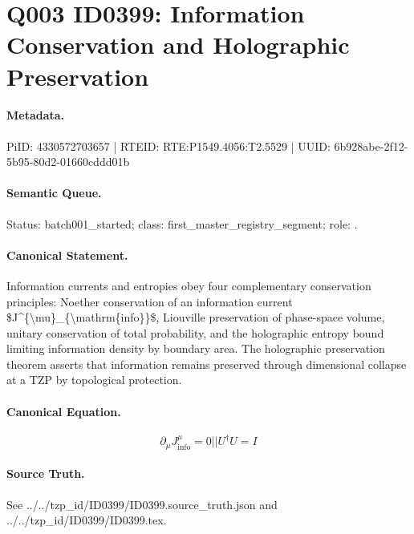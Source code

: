 \section*{Q003 ID0399: Information Conservation and Holographic Preservation}
\paragraph{Metadata.}
PiID: 4330572703657 | RTEID: RTE:P1549.4056:T2.5529 | UUID: 6b928abe-2f12-5b95-80d2-01660cddd01b

\paragraph{Semantic Queue.}
Status: batch001\_started; class: first\_master\_registry\_segment; role: .

\paragraph{Canonical Statement.}
Information currents and entropies obey four complementary conservation principles: Noether conservation of an information current \$J\textasciicircum{}\{\textbackslash{}mu\}\_\{\textbackslash{}mathrm\{info\}\}\$, Liouville preservation of phase-space volume, unitary conservation of total probability, and the holographic entropy bound limiting information density by boundary area. The holographic preservation theorem asserts that information remains preserved through dimensional collapse at a TZP by topological protection.

\paragraph{Canonical Equation.}
\[
\partial_{\mu}J^{\mu}_{\mathrm{info}}=0 || U^{\dagger}U=I
\]

\paragraph{Source Truth.}
See ../../tzp\_id/ID0399/ID0399.source\_truth.json and ../../tzp\_id/ID0399/ID0399.tex.
